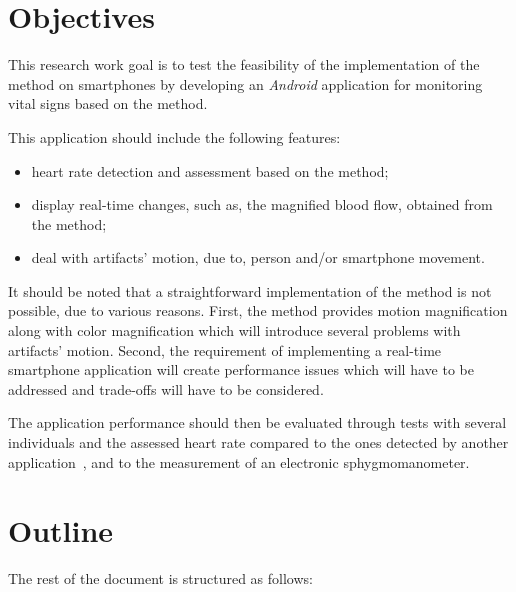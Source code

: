 \section{Objectives} \label{sec:intro:objectives}


This research work goal is to test the feasibility of the
implementation of the \evm{} method on smartphones by developing
an \emph{Android} application for monitoring vital signs based on
the \evm{} method.

This application should include the following features:

\begin{itemize}
  \item heart rate detection and assessment based on the \evm{}
        method;
  \item display real-time changes, such as, the magnified blood
        flow, obtained from the \evm{} method;
  \item deal with artifacts' motion, due to, person and/or
        smartphone movement.
\end{itemize}

It should be noted that a straightforward implementation of the \evm{}
method is not possible, due to various reasons. First, the \evm{} method
provides motion magnification along with color magnification which will
introduce several problems with artifacts' motion. Second, the requirement
of implementing a real-time smartphone application will create performance
issues which will have to be addressed and trade-offs will have to be
considered.

The application performance should then be evaluated through tests
with several individuals and the assessed heart rate compared to
the ones detected by another application~\cite{Vitrox2013, Philips2013},
and to the measurement of an electronic sphygmomanometer.

\pagebreak

\section{Outline} \label{sec:intro:outline}


The rest of the document is structured as follows:

